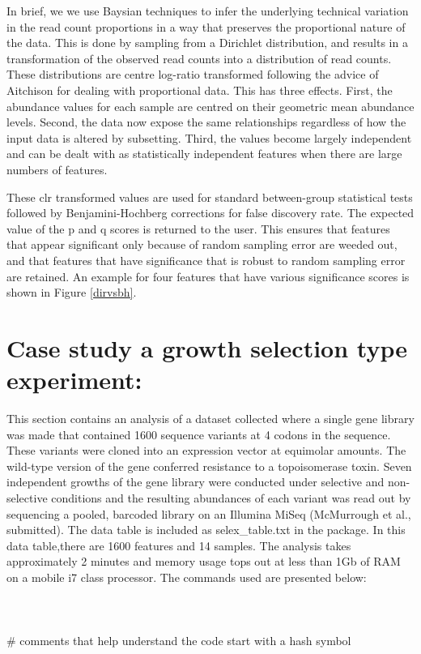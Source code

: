 \documentclass[11pt]{article}
\begin{document}
In brief, we we use Baysian techniques to infer the underlying technical variation in the read count proportions in a way that preserves the proportional nature of the data. This is done by sampling from a Dirichlet distribution, and results in a transformation of the observed read counts into a distribution of read counts. These distributions are centre log-ratio transformed following the advice of Aitchison\cite{Aitchison:1986} for dealing with proportional data. This has three effects. First, the abundance values for each sample are centred on their geometric mean abundance levels. Second, the data now expose the same relationships regardless of how the input data is altered by subsetting. Third, the values become largely independent and can be dealt with as statistically independent features when there are large numbers of features. 

These clr transformed values are used for standard between-group statistical tests  followed by Benjamini-Hochberg corrections for false discovery rate. The expected value of the p and q scores is returned to the user. This ensures that features that appear significant only because of random sampling error are weeded out, and that features that have significance that is robust to random sampling error are retained. An example for four features that have various significance scores is shown in Figure \ref{dirvsbh}. 

\section{Case study a growth selection type experiment:}{\label{example}} This section contains an analysis of a dataset collected where a single gene  library was made that contained 1600 sequence variants at 4 codons in the sequence. These variants were cloned into an expression vector at equimolar amounts. The wild-type version of the gene conferred resistance to a topoisomerase toxin. Seven independent growths of the gene library were conducted under selective and non-selective conditions and the resulting abundances of each variant was read out by sequencing a pooled, barcoded library on an Illumina MiSeq (McMurrough et al., submitted). The data table is included as selex\_table.txt in the package. In this data table,there are 1600 features and 14 samples. The analysis takes approximately 2 minutes and memory usage tops out at less than 1Gb of RAM on a mobile i7 class processor.  The commands used are presented below:\\\\
\\\\
\noindent \#  comments that help understand the code start with a hash symbol\\
\end{document}
